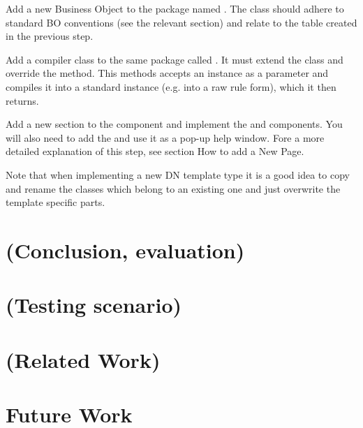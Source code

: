 \begin{description}[style=nextline,font=\ttfamily]
Add a new Business Object to the  package named . The class should adhere to standard BO conventions (see the relevant section) and relate to the table created in the previous step.

Add a compiler class to the same package called . It must extend the  class and override the  method. This methods accepts an  instance as a parameter and compiles it into a standard  instance (e.g. into a raw rule form), which it then returns.

Add a new section to the  component and implement the  and  components. You will also need to add the  and use it as a pop-up help window. Fore a more detailed explanation of this step, see section How to add a New Page.

Note that when implementing a new DN template type it is a good idea to copy and rename the classes which belong to an existing one and just overwrite the template specific parts.


\chapter{(Conclusion, evaluation)}

\chapter{(Testing scenario)}

\chapter{(Related Work)}

\chapter{Future Work}


\end{description}
